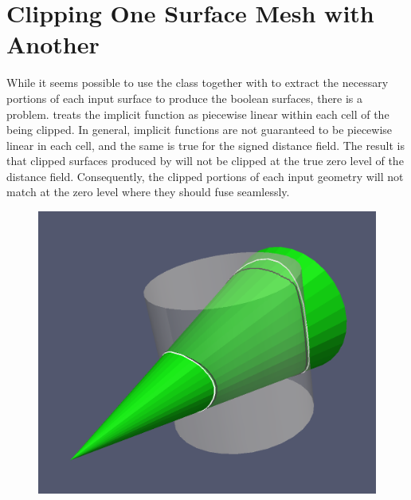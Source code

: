 \documentclass{InsightArticle}
\begin{document}
\section{Clipping One Surface Mesh with Another}

While it seems possible to use the class  together with  to extract the necessary portions of each input surface to produce the boolean surfaces, there is a problem.  treats the implicit function as piecewise linear within each cell of the  being clipped. In general, implicit functions are not guaranteed to be piecewise linear in each cell, and the same is true for the signed distance field. The result is that clipped surfaces produced by  will not be clipped at the true zero level of the distance field. Consequently, the clipped portions of each input geometry will not match at the zero level where they should fuse seamlessly.

\begin{figure}[t]
\centering
\includegraphics[scale=0.25]{Figures/DistanceZeroLevelVsIntersection}
\label{fig:DistanceZeroLevelVsIntersection}
\end{figure}
\end{document}
